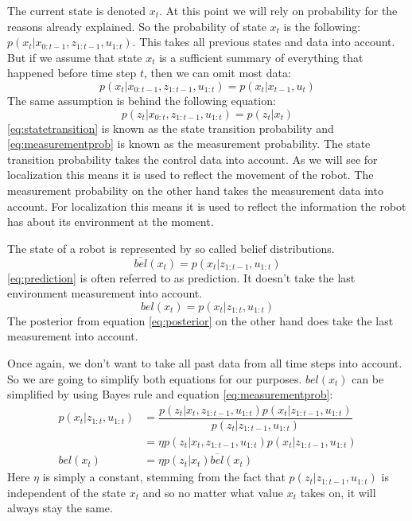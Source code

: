 The current state is denoted $x_t$. At this point we will rely on probability for the reasons already explained. So the probability of state $x_t$ is the following: $p(x_t|x_{0:t-1},z_{1:t-1}, u_{1:t})$. This takes all previous states and data into account. But if we assume that state $x_t$ is a sufficient summary of everything that happened before time step $t$, then we can omit most data: 
\begin{equation} \label{eq:statetransition}
p(x_t|x_{0:t-1},z_{1:t-1}, u_{1:t}) = p(x_t|x_{t-1}, u_t)
\end{equation}
The same assumption is behind the following equation:
\begin{equation} \label{eq:measurementprob}
p(z_t|x_{0:t},z_{1:t-1}, u_{1:t}) = p(z_t|x_t)
\end{equation}
\ref{eq:statetransition} is known as the state transition probability and \ref{eq:measurementprob} is known as the measurement probability. The state transition probability takes the control data into account. As we will see for localization this means it is used to reflect the movement of the robot. The measurement probability on the other hand takes the measurement data into account. For localization this means it is used to reflect the information the robot has about its environment at the moment. \cite[p. 24-25]{Thrun:2005:PR:1121596}

The state of a robot is represented by so called belief distributions. 
\begin{equation} \label{eq:prediction}
\overline{bel}(x_t) = p(x_t|z_{1:t-1}, u_{1:t})
\end{equation}
\ref{eq:prediction} is often referred to as prediction. It doesn't take the last environment measurement into account. 
\begin{equation} \label{eq:posterior}
bel(x_t) = p(x_t|z_{1:t}, u_{1:t})
\end{equation}
The posterior from equation \ref{eq:posterior} on the other hand does take the last measurement into account. \cite[p. 25-26]{Thrun:2005:PR:1121596}

Once again, we don't want to take all past data from all time steps into account. So we are going to simplify both equations for our purposes. $bel(x_t)$ can be simplified by using Bayes rule and equation \ref{eq:measurementprob}:
\begin{equation}\label{bayes}
\begin{aligned}
p(x_t|z_{1:t}, u_{1:t}) &= \dfrac{p(z_t|x_t,z_{1:t-1},u_{1:t})p(x_t|z_{1:t-1},u_{1:t})}{p(z_t|z_{1:t-1},u_{1:t})}\\
&= \eta p(z_t|x_t,z_{1:t-1},u_{1:t})p(x_t|z_{1:t-1},u_{1:t})\\
bel(x_t) &= \eta p(z_t|x_t)\overline{bel}(x_t)
\end{aligned}
\end{equation}
Here $\eta$ is simply a constant, stemming from the fact that $p(z_t|z_{1:t-1},u_{1:t})$ is independent of the state $x_t$ and so no matter what value $x_t$ takes on, it will always stay the same. 

